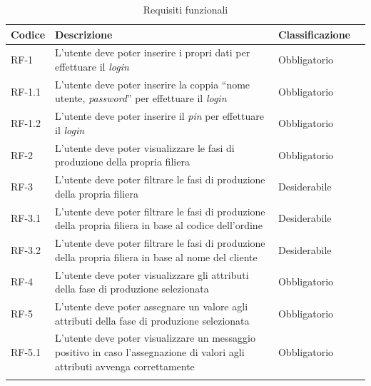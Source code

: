 \begin{longtable}{>{\centering\arraybackslash}m{}>{\centering\arraybackslash}m{}>{\centering\arraybackslash}m{}>{\centering\arraybackslash}m{}}
    \hline
    \rowcolor{black}
    \color{white}\textbf{Codice} & \color{white}\textbf{Descrizione} & \color{white}\textbf{Classificazione} \\
    \hline
    \endhead %
    RF-1 & L’utente deve poter inserire i propri dati per effettuare il \textit{login} & Obbligatorio \\
    \hline
    RF-1.1 & L’utente deve poter inserire la coppia “nome utente, \textit{password}” per effettuare il \textit{login} & Obbligatorio \\
    \hline
    RF-1.2 & L’utente deve poter inserire il \textit{pin} per effettuare il \textit{login} & Obbligatorio \\
    \hline
    RF-2 & L’utente deve poter visualizzare le fasi di produzione della propria filiera & Obbligatorio \\
    \hline
    RF-3 & L’utente deve poter filtrare le fasi di produzione della propria filiera & Desiderabile \\
    \hline
    RF-3.1 & L’utente deve poter filtrare le fasi di produzione della propria filiera in base al codice dell’ordine & Desiderabile \\
    \hline
    RF-3.2 & L’utente deve poter filtrare le fasi di produzione della propria filiera in base al nome del cliente & Desiderabile \\
    \hline
    RF-4 & L’utente deve poter visualizzare gli attributi della fase di produzione selezionata & Obbligatorio \\
    \hline
    RF-5 & L’utente deve poter assegnare un valore agli attributi della fase di produzione selezionata & Obbligatorio \\
    \hline
    RF-5.1 & L’utente deve poter visualizzare un messaggio positivo in caso l’assegnazione di valori agli attributi avvenga correttamente & Obbligatorio \\
    \hline
    \caption{Requisiti funzionali}
    \label{tab:requisiti-funzionali}
\end{longtable}

